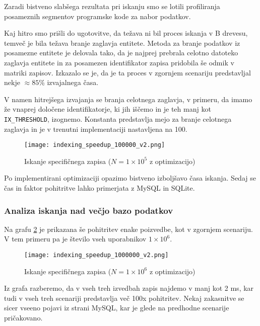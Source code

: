 \documentclass[a4paper,12pt,openright]{book}
\begin{document}
    Zaradi bistveno slabšega rezultata pri iskanju smo se lotili profiliranja posameznih segmentov programske kode za nabor podatkov.

    Kaj hitro smo prišli do ugotovitve, da težava ni bil proces iskanja v B drevesu, temveč je bila težava branje zaglavja entitete. Metoda za branje podatkov iz posamezne entitete je delovala tako, da je najprej prebrala celotno datoteko zaglavja entitete in za posamezen identifikator zapisa pridobila še odmik v matriki zapisov. Izkazalo se je, da je ta proces v zgornjem scenariju predstavljal nekje $\approx 85$\% izvajalnega časa.

    V namen hitrejšega izvajanja se branja celotnega zaglavja, v primeru, da imamo že vnaprej določene identifikatorje, ki jih iščemo in je teh manj kot {\tt IX\_THRESHOLD}, izognemo. Konstanta predstavlja mejo za branje celotnega zaglavja in je v trenutni implementaciji nastavljena na \num{100}.
    
    \begin{figure}[H]
        \centerline{\texttt{[image: indexing\_speedup\_100000\_v2.png]}}
        \caption{Iskanje specifičnega zapisa ($N = 1 \times 10^5$ z optimizacijo)}
        \label{idx_speedup}
    \end{figure}

    \noindent
    Po implementirani optimizaciji opazimo bistveno izboljšavo časa iskanja. Sedaj se čas in faktor pohitritve lahko primerjata z MySQL in SQLite.

    \subsubsection{Analiza iskanja nad večjo bazo podatkov}

    Na grafu \ref{idx_speedup_2} je prikazana še pohitritev enake poizvedbe, kot v zgornjem scenariju. V tem primeru pa je število vseh uporabnikov $1 \times 10^6$.
    
    \begin{figure}[H]
        \centerline{\texttt{[image: indexing\_speedup\_1000000\_v2.png]}}
        \caption{Iskanje specifičnega zapisa ($N = 1 \times 10^6$ z optimizacijo)}
        \label{idx_speedup_2}
    \end{figure}

    \noindent
    Iz grafa razberemo, da v vseh treh izvedbah zapis najdemo v manj kot 2 ms, kar tudi v vseh treh scenariji predstavlja več 100x pohitritev. Nekaj zakasnitve se sicer vseeno pojavi iz strani MySQL, kar je glede na predhodne scenarije pričakovano.
\end{document}
